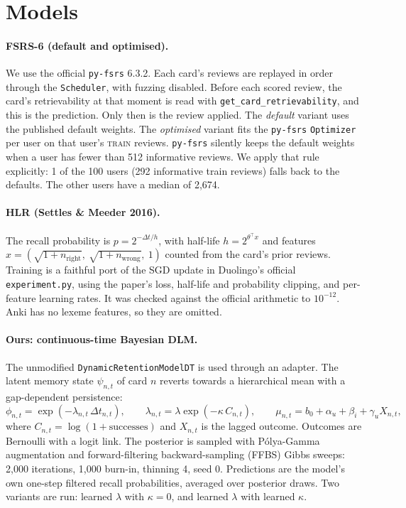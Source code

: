 \documentclass[11pt,a4paper]{article}
\begin{document}
\section{Models}
\paragraph{FSRS-6 (default and optimised).} We use the official \texttt{py-fsrs} 6.3.2. Each card's reviews are replayed in order through the \texttt{Scheduler}, with fuzzing disabled. Before each scored review, the card's retrievability at that moment is read with \texttt{get\_card\_retrievability}, and this is the prediction. Only then is the review applied. The \emph{default} variant uses the published default weights. The \emph{optimised} variant fits the \texttt{py-fsrs} \texttt{Optimizer} per user on that user's \textsc{train} reviews. \texttt{py-fsrs} silently keeps the default weights when a user has fewer than 512 informative reviews. We apply that rule explicitly: 1 of the 100 users (292 informative train reviews) falls back to the defaults. The other users have a median of 2{,}674.

\paragraph{HLR (Settles \& Meeder 2016).} The recall probability is $p = 2^{-\Delta t/h}$, with half-life $h = 2^{\theta^\top x}$ and features $x = (\sqrt{1+n_\text{right}},\ \sqrt{1+n_\text{wrong}},\ 1)$ counted from the card's prior reviews. Training is a faithful port of the SGD update in Duolingo's official \texttt{experiment.py}, using the paper's loss, half-life and probability clipping, and per-feature learning rates. It was checked against the official arithmetic to $10^{-12}$. Anki has no lexeme features, so they are omitted.

\paragraph{Ours: continuous-time Bayesian DLM.} The unmodified \texttt{DynamicRetentionModelDT} is used through an adapter. The latent memory state $\psi_{n,t}$ of card $n$ reverts towards a hierarchical mean with a gap-dependent persistence:
\[
\phi_{n,t} = \exp(-\lambda_{n,t}\,\Delta t_{n,t}),\qquad
\lambda_{n,t} = \lambda\exp(-\kappa\,C_{n,t}),\qquad
\mu_{n,t} = b_0 + \alpha_u + \beta_i + \gamma_u X_{n,t},
\]
where $C_{n,t}=\log(1+\text{successes})$ and $X_{n,t}$ is the lagged outcome. Outcomes are Bernoulli with a logit link. The posterior is sampled with Pólya-Gamma augmentation and forward-filtering backward-sampling (FFBS) Gibbs sweeps: 2{,}000 iterations, 1{,}000 burn-in, thinning 4, seed 0. Predictions are the model's own one-step filtered recall probabilities, averaged over posterior draws. Two variants are run: learned $\lambda$ with $\kappa=0$, and learned $\lambda$ with learned $\kappa$.
\end{document}
